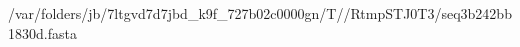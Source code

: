 \documentclass[10pt]{article}
\begin{document}
\begin{texshade}{/var/folders/jb/7ltgvd7d7jbd_k9f_727b02c0000gn/T//RtmpSTJ0T3/seq3b242bb1830d.fasta}
\hidelogoscale
{}
\showlegend
\end{texshade}
\end{document}

